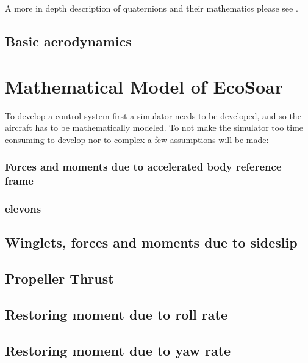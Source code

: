 \documentclass{article}
\begin{document}
A more in depth description of quaternions and their mathematics please see \cite{Sola2016}.



\subsection {Basic aerodynamics}


\section{Mathematical Model of EcoSoar}
To develop a control system first a simulator needs to be developed, and so the aircraft has to be mathematically modeled.
To not make the simulator too time consuming to develop nor to complex a few assumptions will be made:


%



\subsubsection{Forces and moments due to accelerated body reference frame}



\subsubsection{elevons}


\subsection{Winglets, forces and moments due to sideslip}


\subsection{Propeller Thrust}


\subsection{Restoring moment due to roll rate}
\label{sec:restmomroll}


\subsection{Restoring moment due to yaw rate}

\end{document}
